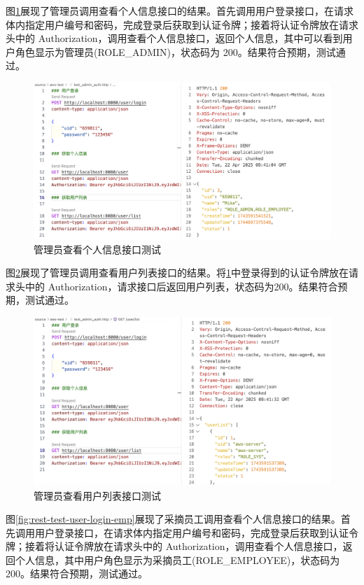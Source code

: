 图\ref{fig:rest-test-user-login-admin}展现了管理员调用查看个人信息接口的结果。首先调用用户登录接口，在请求体内指定用户编号和密码，完成登录后获取到认证令牌；接着将认证令牌放在请求头中的 Authorization，调用查看个人信息接口，返回个人信息，其中可以看到用户角色显示为管理员(ROLE\_ADMIN)，状态码为 200。结果符合预期，测试通过。

\begin{figure}
    \centering
    \includegraphics[width=0.9\linewidth]{../result/rest-test-user-login-admin.png}
    \caption{管理员查看个人信息接口测试}
    \label{fig:rest-test-user-login-admin}
\end{figure}

图\ref{fig:rest-test-user-list-admin}展现了管理员调用查看用户列表接口的结果。将\ref{fig:rest-test-user-login-admin}中登录得到的认证令牌放在请求头中的 Authorization，请求接口后返回用户列表，状态码为200。结果符合预期，测试通过。

\begin{figure}
    \centering
    \includegraphics[width=0.9\linewidth]{../result/rest-test-user-list-admin.png}
    \caption{管理员查看用户列表接口测试}
    \label{fig:rest-test-user-list-admin}
\end{figure}

图\ref{fig:rest-test-user-login-emp}展现了采摘员工调用查看个人信息接口的结果。首先调用用户登录接口，在请求体内指定用户编号和密码，完成登录后获取到认证令牌；接着将认证令牌放在请求头中的 Authorization，调用查看个人信息接口，返回个人信息，其中用户角色显示为采摘员工(ROLE\_EMPLOYEE)，状态码为 200。结果符合预期，测试通过。

